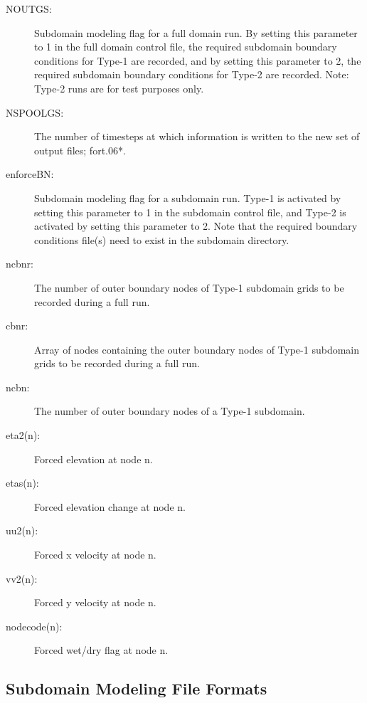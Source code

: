 \documentclass[11pt,titlepage]{article}
\begin{document}
\begin{description}

\item[NOUTGS:] Subdomain modeling flag for a full domain run. 
By setting this parameter to 1 in the full domain control file, the 
required  subdomain boundary conditions for Type-1 are 
recorded, and by setting this parameter to 2, the required subdomain 
boundary conditions for Type-2 are recorded. 
Note: Type-2 runs are for test purposes only.

\item[NSPOOLGS:] The number of timesteps at which information is 
written to the new set of output files; fort.06*.

\item[enforceBN:] Subdomain modeling flag for a subdomain run.
Type-1 is activated by setting this parameter to 1 in 
the subdomain control file, and Type-2 is activated by 
setting this parameter to 2. Note that the required boundary 
conditions file(s) need to exist in the subdomain directory.

\item[ncbnr:] The number of outer boundary nodes of Type-1 
subdomain grids to be recorded during a full run. 

\item[cbnr:] Array of nodes containing the outer boundary nodes
of Type-1 subdomain grids to be recorded during a full run.

\item[ncbn:] The number of outer boundary nodes of a Type-1 subdomain.

\item[eta2(n):] Forced elevation at node n.

\item[etas(n):] Forced elevation change at node n.

\item[uu2(n):] Forced x velocity at node n.

\item[vv2(n):] Forced y velocity at node n.

\item[nodecode(n):] Forced wet/dry flag at node n.

\end{description}

\subsection{Subdomain Modeling File Formats}
\end{document}
